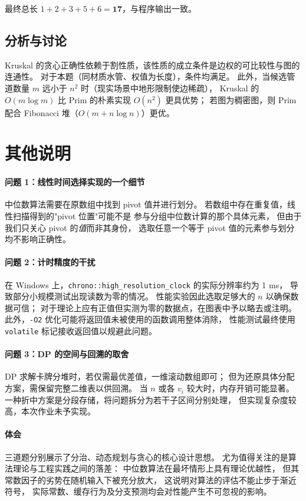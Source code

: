 \documentclass[12pt, a4paper]{ctexart}
\begin{document}
最终总长 $1+2+3+5+6 = \mathbf{17}$，与程序输出一致。

\subsection{分析与讨论}

Kruskal 的贪心正确性依赖于割性质，该性质的成立条件是边权的可比较性与图的连通性。
对于本题（同材质水管、权值为长度），条件均满足。
此外，当候选管道数量 $m$ 远小于 $n^2$ 时（现实场景中地形限制使边稀疏），
Kruskal 的 $O(m \log m)$ 比 Prim 的朴素实现 $O(n^2)$ 更具优势；
若图为稠密图，则 Prim 配合 Fibonacci 堆（$O(m + n\log n)$）更优。

\newpage

\section{其他说明}

\paragraph{问题 1：线性时间选择实现的一个细节}
中位数算法需要在原数组中找到 pivot 值并进行划分。
若数组中存在重复值，线性扫描得到的"pivot 位置"可能不是
参与分组中位数计算的那个具体元素，
但由于我们只关心 pivot 的\emph{值}而非其身份，
选取任意一个等于 pivot 值的元素参与划分均不影响正确性。

\paragraph{问题 2：计时精度的干扰}
在 Windows 上，\texttt{chrono::high\_resolution\_clock} 的实际分辨率约为 1 ms，
导致部分小规模测试出现读数为零的情况。
性能实验因此选取足够大的 $n$ 以确保数据可信；
对于理论上应有正值但实测为零的数据点，在图表中予以略去或注明。
此外，\texttt{-O2} 优化可能将返回值未被使用的函数调用整体消除，
性能测试最终使用 \texttt{volatile} 标记接收返回值以规避此问题。

\paragraph{问题 3：DP 的空间与回溯的取舍}
DP 求解卡牌分堆时，若仅需最优差值，一维滚动数组即可；
但为还原具体分配方案，需保留完整二维表以供回溯。
当 $n$ 或各 $v_i$ 较大时，内存开销可能显著。
一种折中方案是分段存储，将问题拆分为若干子区间分别处理，
但实现复杂度较高，本次作业未予实现。

\paragraph{体会}
三道题分别展示了分治、动态规划与贪心的核心设计思想。
尤为值得关注的是算法理论与工程实践之间的落差：
中位数算法在最坏情形上具有理论优越性，
但其常数因子的劣势在随机输入下被充分放大，
这说明对算法的评估不能止步于渐近符号，
实际常数、缓存行为及分支预测均会对性能产生不可忽视的影响。
\end{document}
